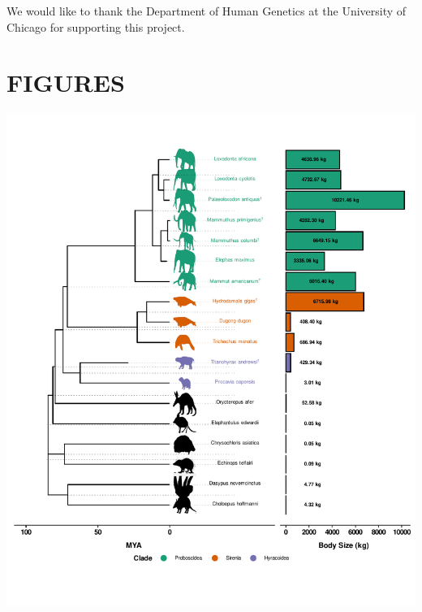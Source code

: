 \documentclass[]{elsarticle} %
\let\origfigure\figure
\let\endorigfigure\endfigure
\renewenvironment{figure}[1][2] {
    \expandafter\origfigure\expandafter[H]
} {
    \endorigfigure
}
\begin{document}
We would like to thank the Department of Human Genetics at the University of Chicago for supporting this project.

\hypertarget{figures}{%
\section{FIGURES}\label{figures}}



\begin{figure}[H]
\includegraphics[width=6in,]{paper_PLOS_draft_files/figure-latex/Figure-intro-1} \caption{\emph{Atlantogenatans} span a diverse range of body sizes (\emph{18}, \emph{25}).}\label{fig:Figure-intro}
\end{figure}
\end{document}
